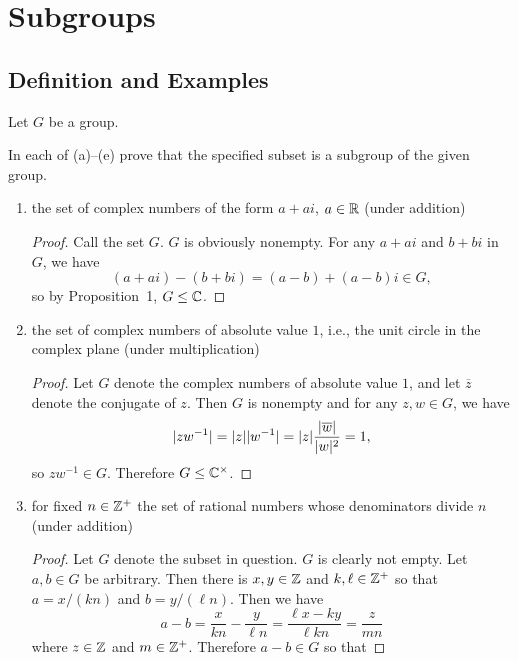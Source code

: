 \chapter{Subgroups}

\section{Definition and Examples}

Let $G$ be a group.

 In each of (a)--(e) prove that the specified subset is a
subgroup of the given group.
\begin{enumerate}
\item the set of complex numbers of the form $a + ai$, $a\in\mathbb{R}$ (under
  addition)
  \begin{proof}
    Call the set $G$. $G$ is obviously nonempty. For any $a + ai$ and
    $b + bi$ in $G$, we have
    \begin{equation*}
      (a + ai) - (b + bi) = (a - b) + (a - b)i\in G,
    \end{equation*}
    so by Proposition~1, $G\leq\mathbb{C}$.
  \end{proof}
\item the set of complex numbers of absolute value $1$, i.e., the unit
  circle in the complex plane (under multiplication)
  \begin{proof}
    Let $G$ denote the complex numbers of absolute value $1$, and let
    $\overline{z}$ denote the conjugate of $z$. Then $G$ is nonempty
    and for any $z,w\in G$, we have
    \begin{equation*}
      \lvert{zw^{-1}}\rvert = \lvert{z}\rvert\lvert{w^{-1}}\rvert
      = \lvert{z}\rvert\frac{\lvert{\overline{w}}\rvert}{\lvert{w}\rvert^2} = 1,
    \end{equation*}
    so $zw^{-1}\in G$. Therefore $G\leq\mathbb{C}^\times$.
  \end{proof}
\item for fixed $n\in\mathbb{Z}^+$ the set of rational numbers whose
  denominators divide $n$ (under addition)
  \begin{proof}
    Let $G$ denote the subset in question. $G$ is clearly not
    empty. Let $a,b\in G$ be arbitrary. Then there is $x,y\in\mathbb{Z}$ and
    $k,\ell\in\mathbb{Z}^+$ so that $a = x/(kn)$ and $b = y/(\ell n)$. Then we
    have
    \begin{equation*}
      a - b = \frac{x}{kn} - \frac{y}{\ell n}
      = \frac{\ell x - ky}{\ell kn} = \frac{z}{mn}
    \end{equation*}
    where $z\in\mathbb{Z}$ and $m\in\mathbb{Z}^+$. Therefore $a - b\in G$ so that

\end{proof}
\end{enumerate}
